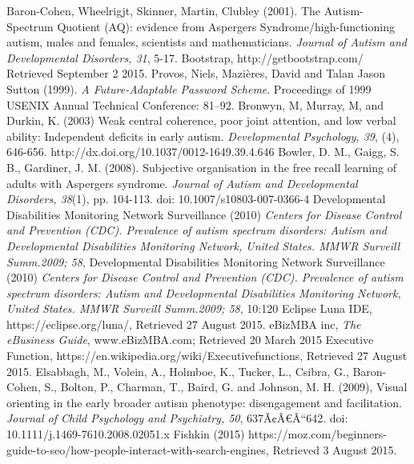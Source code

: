 \documentclass[a4paper, 11pt]{article}
\begin{document}
\clearpage
\begin{thebibliography}{100}

 Baron-Cohen, Wheelrigjt, Skinner, Martin, Clubley (2001).  The Autism-Spectrum Quotient (AQ): evidence from Aspergers Syndrome/high-functioning autism, males and females, scientists and mathematicians.  \textit{Journal of Autism and Developmental Disorders, 31}, 5-17.
Bootstrap, http://getbootstrap.com/ Retrieved September 2 2015.
 Provos, Niels, Mazières, David and Talan Jason Sutton (1999). \textit{A Future-Adaptable Password Scheme}. Proceedings of 1999 USENIX Annual Technical Conference: 81–92.
 Bronwyn, M, Murray, M, and Durkin, K. (2003) Weak central coherence, poor joint attention, and low verbal ability: Independent deficits in early autism. \textit{Developmental Psychology, 39}, (4), 646-656. http://dx.doi.org/10.1037/0012-1649.39.4.646
 Bowler, D. M., Gaigg, S. B., Gardiner, J. M. (2008). Subjective organisation in the free recall learning of adults with Aspergers syndrome. \textit{Journal of Autism and Developmental Disorders, 38}(1), pp. 104-113. doi: 10.1007/s10803-007-0366-4 
Developmental Disabilities Monitoring Network Surveillance (2010) \textit{Centers for Disease Control and Prevention (CDC). Prevalence of autism spectrum disorders: Autism and Developmental Disabilities Monitoring Network, United States. MMWR Surveill Summ.2009; 58},
Developmental Disabilities Monitoring Network Surveillance (2010) \textit{Centers for Disease Control and Prevention (CDC). Prevalence of autism spectrum disorders: Autism and Developmental Disabilities Monitoring Network, United States. MMWR Surveill Summ.2009; 58}, 10:120
 Eclipse Luna IDE, https://eclipse.org/luna/, Retrieved 27 August 2015.
eBizMBA inc, \textit{The eBusiness Guide}, www.eBizMBA.com; Retrieved 20 March 2015
 Executive Function, https://en.wikipedia.org/wiki/Executivefunctions, Retrieved 27 August 2015.
Elsabbagh, M., Volein, A., Holmboe, K., Tucker, L., Csibra, G., Baron-Cohen, S., Bolton, P., Charman, T., Baird, G. and Johnson, M. H. (2009), Visual orienting in the early broader autism phenotype: disengagement and facilitation. \textit{Journal of Child Psychology and Psychiatry, 50}, 637Ã¢Â€Â“642. doi: 10.1111/j.1469-7610.2008.02051.x
 Fishkin (2015) https://moz.com/beginners-guide-to-seo/how-people-interact-with-search-engines, Retrieved 3 August 2015.

\end{thebibliography}
\end{document}
